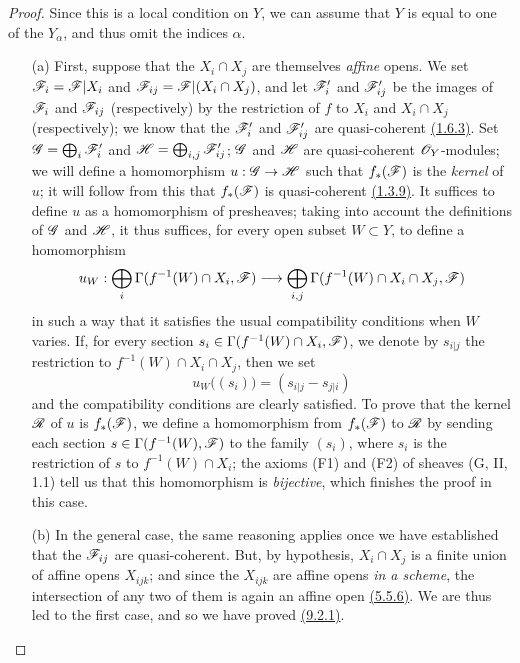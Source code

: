 \begin{proof}
\label{proof-prop-1.9.2.1}
Since this is a local condition on $Y$, we can assume that $Y$ is equal to one
of the $Y_\alpha$, and thus omit the indices $\alpha$.

\begin{itemize}
  \item[(a)] First, suppose that the $X_i\cap X_j$
        are themselves {\it affine} opens. We set $\mathscr{F}_i=\mathscr{F}|X_i$ and
        $\mathscr{F}_{ij}=\mathscr{F}|(X_i\cap X_j)$, and let $\mathscr{F}'_i$ and
        $\mathscr{F}'_{ij}$ be the images of $\mathscr{F}_i$ and $\mathscr{F}_{ij}$
        (respectively) by the restriction of $f$ to $X_i$ and $X_i\cap X_j$
        (respectively); we know that the $\mathscr{F}'_i$ and $\mathscr{F}'_{ij}$ are
        quasi-coherent \hyperref[prop-1.1.6.3]{(1.6.3)}. Set $\mathscr{G}=\bigoplus_i\mathscr{F}'_i$ and
        $\mathscr{H}=\bigoplus_{i,j}\mathscr{F}'_{ij}$; $\mathscr{G}$ and $\mathscr{H}$ are
        quasi-coherent $\mathscr{O}_Y$-modules; we will define a homomorphism
        $u:\mathscr{G}\to\mathscr{H}$ such that $f_*(\mathscr{F})$ is the
        {\it kernel} of $u$; it will follow from this that $f_*(\mathscr{F})$ is
        quasi-coherent \hyperref[cor-1.1.3.9]{(1.3.9)}. It suffices to define $u$ as
        a homomorphism of presheaves; taking into account the definitions of $\mathscr{G}$
        and $\mathscr{H}$, it thus suffices, for every open subset $W\subset Y$, to define a
        homomorphism
        \[
          u_W:\bigoplus_i\Gamma(f^{-1}(W)\cap X_i,\mathscr{F})
          \longrightarrow\bigoplus_{i,j}\Gamma(f^{-1}(W)\cap X_i\cap X_j,\mathscr{F})
        \]
        in such a way that it satisfies the usual compatibility conditions when $W$
        varies. If, for every section $s_i\in\Gamma(f^{-1}(W)\cap X_i,\mathscr{F})$, we
        denote by $s_{i|j}$ the restriction to $f^{-1}(W)\cap X_i\cap X_j$, then we set
        \[
          u_W\big((s_i)\big)=(s_{i|j}-s_{j|i})
        \]
        and the compatibility conditions are clearly satisfied. To prove that the kernel
        $\mathscr{R}$ of $u$ is $f_*(\mathscr{F})$, we define a homomorphism from $f_*(\mathscr{F})$ to
        $\mathscr{R}$ by sending each section $s\in\Gamma(f^{-1}(W),\mathscr{F})$ to the family
        $(s_i)$, where $s_i$ is the restriction of $s$ to $f^{-1}(W)\cap X_i$; the
        axioms (F1) and (F2) of sheaves (G, II, 1.1) tell us that this homomorphism is
        {\it bijective}, which finishes the proof in this case.
  \item[(b)] In the general case, the same reasoning applies once we have established that
        the $\mathscr{F}_{ij}$ are quasi-coherent. But, by hypothesis, $X_i\cap X_j$ is a
        finite union of affine opens $X_{ijk}$; and since the $X_{ijk}$ are affine opens
        {\it in a scheme}, the intersection of any two of them is again an affine open
        \hyperref[env-1.5.5.6]{(5.5.6)}. We are thus led to the first case, and so we have proved
        \hyperref[prop-1.9.2.1]{(9.2.1)}.
\end{itemize}
\end{proof}

